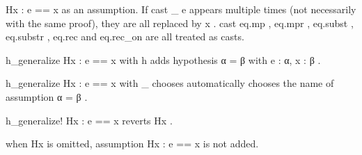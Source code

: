 \documentclass{article}
\begin{document}
\colorbox[RGB]{253,246,227}{{{{\color[RGB]{101, 123, 131} Hx : e  }}}{{{\color[RGB]{181, 137, 0} == }}}{{{\color[RGB]{101, 123, 131}  x }}}} as an assumption. If 
\colorbox[RGB]{253,246,227}{{{{\color[RGB]{101, 123, 131} cast \_ e }}}} appears multiple
times (not necessarily with the same proof), they are all replaced by 
\colorbox[RGB]{253,246,227}{{{{\color[RGB]{101, 123, 131} x }}}}. 
\colorbox[RGB]{253,246,227}{{{{\color[RGB]{101, 123, 131} cast }}}}\colorbox[RGB]{253,246,227}{{{{\color[RGB]{101, 123, 131} eq.mp }}}}, 
\colorbox[RGB]{253,246,227}{{{{\color[RGB]{101, 123, 131} eq.mpr }}}}, 
\colorbox[RGB]{253,246,227}{{{{\color[RGB]{101, 123, 131} eq.subst }}}}, 
\colorbox[RGB]{253,246,227}{{{{\color[RGB]{101, 123, 131} eq.substr }}}}, 
\colorbox[RGB]{253,246,227}{{{{\color[RGB]{101, 123, 131} eq.rec }}}} and 
\colorbox[RGB]{253,246,227}{{{{\color[RGB]{101, 123, 131} eq.rec\_on }}}} are all treated
as casts.
\par
\colorbox[RGB]{253,246,227}{{{{\color[RGB]{101, 123, 131} h\_generalize Hx : e  }}}{{{\color[RGB]{181, 137, 0} == }}}{{{\color[RGB]{101, 123, 131}  x  }}}{{{\color[RGB]{133, 153, 0} with }}}{{{\color[RGB]{101, 123, 131}  h }}}} adds hypothesis 
\colorbox[RGB]{253,246,227}{{{{\color[RGB]{101, 123, 131} α  }}}{{{\color[RGB]{181, 137, 0} = }}}{{{\color[RGB]{101, 123, 131}  β }}}} with 
\colorbox[RGB]{253,246,227}{{{{\color[RGB]{101, 123, 131} e : α, x : β }}}}.
\par
\colorbox[RGB]{253,246,227}{{{{\color[RGB]{101, 123, 131} h\_generalize Hx : e  }}}{{{\color[RGB]{181, 137, 0} == }}}{{{\color[RGB]{101, 123, 131}  x  }}}{{{\color[RGB]{133, 153, 0} with }}}{{{\color[RGB]{101, 123, 131}  \_ }}}} chooses automatically chooses the name of
assumption 
\colorbox[RGB]{253,246,227}{{{{\color[RGB]{101, 123, 131} α  }}}{{{\color[RGB]{181, 137, 0} = }}}{{{\color[RGB]{101, 123, 131}  β }}}}.
\par
\colorbox[RGB]{253,246,227}{{{{\color[RGB]{101, 123, 131} h\_generalize! Hx : e  }}}{{{\color[RGB]{181, 137, 0} == }}}{{{\color[RGB]{101, 123, 131}  x }}}} reverts 
\colorbox[RGB]{253,246,227}{{{{\color[RGB]{101, 123, 131} Hx }}}}.
\par
when 
\colorbox[RGB]{253,246,227}{{{{\color[RGB]{101, 123, 131} Hx }}}} is omitted, assumption 
\colorbox[RGB]{253,246,227}{{{{\color[RGB]{101, 123, 131} Hx : e  }}}{{{\color[RGB]{181, 137, 0} == }}}{{{\color[RGB]{101, 123, 131}  x }}}} is not added.
\end{document}
